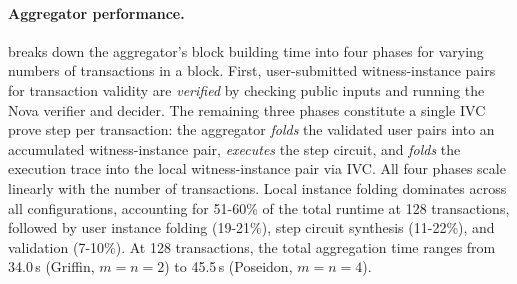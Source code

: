 \paragraph{Aggregator performance.}
 breaks down the aggregator's block building time into four phases for varying numbers of transactions in a block.
First, user-submitted witness-instance pairs for transaction validity are \emph{verified} by checking public inputs and running the Nova verifier and decider.
The remaining three phases constitute a single IVC prove step per transaction:
the aggregator \emph{folds} the validated user pairs into an accumulated witness-instance pair,
\emph{executes} the step circuit,
and \emph{folds} the execution trace into the local witness-instance pair via \ac{IVC}.
All four phases scale linearly with the number of transactions.
Local instance folding dominates across all configurations, accounting for 51-60\% of the total runtime at 128 transactions, followed by user instance folding (19-21\%), step circuit synthesis (11-22\%), and validation (7-10\%).
At 128 transactions, the total aggregation time ranges from 34.0\,s (Griffin, $m{=}n{=}2$) to 45.5\,s (Poseidon, $m{=}n{=}4$).

